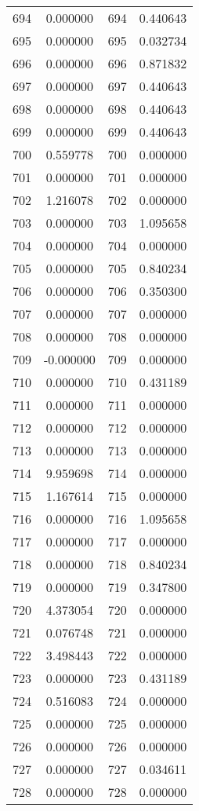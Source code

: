 \documentclass[12pt]{article}
\begin{document}
\begin{longtable}{@{}cccc@{}}
694 & 0.000000 & 694 & 0.440643 \\
695 & 0.000000 & 695 & 0.032734 \\
696 & 0.000000 & 696 & 0.871832 \\
697 & 0.000000 & 697 & 0.440643 \\
698 & 0.000000 & 698 & 0.440643 \\
699 & 0.000000 & 699 & 0.440643 \\
700 & 0.559778 & 700 & 0.000000 \\
701 & 0.000000 & 701 & 0.000000 \\
702 & 1.216078 & 702 & 0.000000 \\
703 & 0.000000 & 703 & 1.095658 \\
704 & 0.000000 & 704 & 0.000000 \\
705 & 0.000000 & 705 & 0.840234 \\
706 & 0.000000 & 706 & 0.350300 \\
707 & 0.000000 & 707 & 0.000000 \\
708 & 0.000000 & 708 & 0.000000 \\
709 & -0.000000 & 709 & 0.000000 \\
710 & 0.000000 & 710 & 0.431189 \\
711 & 0.000000 & 711 & 0.000000 \\
712 & 0.000000 & 712 & 0.000000 \\
713 & 0.000000 & 713 & 0.000000 \\
714 & 9.959698 & 714 & 0.000000 \\
715 & 1.167614 & 715 & 0.000000 \\
716 & 0.000000 & 716 & 1.095658 \\
717 & 0.000000 & 717 & 0.000000 \\
718 & 0.000000 & 718 & 0.840234 \\
719 & 0.000000 & 719 & 0.347800 \\
720 & 4.373054 & 720 & 0.000000 \\
721 & 0.076748 & 721 & 0.000000 \\
722 & 3.498443 & 722 & 0.000000 \\
723 & 0.000000 & 723 & 0.431189 \\
724 & 0.516083 & 724 & 0.000000 \\
725 & 0.000000 & 725 & 0.000000 \\
726 & 0.000000 & 726 & 0.000000 \\
727 & 0.000000 & 727 & 0.034611 \\
728 & 0.000000 & 728 & 0.000000 \\

\end{longtable}
\end{document}
